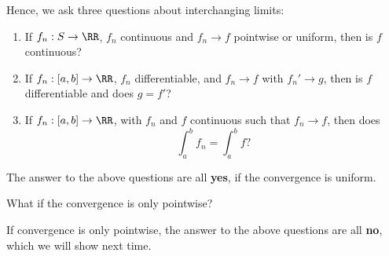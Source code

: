 \begin{question}
Hence, we ask three questions about interchanging limits:
\begin{enumerate}
\item If $f_n:S\to \RR$, $f_n$ continuous and $f_n\to f$ pointwise or uniform, then is $f$ continuous?
\item If $f_n:[a,b]\to \RR$, $f_n$ differentiable, and $f_n\to f$ with $f_n'\to g$, then is $f$ differentiable and does $g=f'$?
\item If $f_n:[a,b]\to \RR$, with $f_n$ and $f$ continuous such that $f_n\to f$, then does 
\[
\int_a^b f_n = \int_a^b f?
\]
\end{enumerate}
\end{question}
The answer to the above questions are all \textbf{yes}, if the convergence is uniform.

\begin{question}
What if the convergence is only pointwise?
\end{question}
If convergence is only pointwise, the answer to the above questions are all \textbf{no}, which we will show next time.


